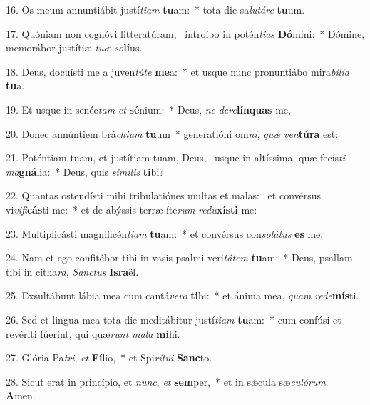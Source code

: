 16. Os meum annuntiábit justí\textit{ti}\textit{am} \textbf{tu}am:~*  tota die sa\textit{lu}\textit{tá}\textit{re} \textbf{tu}um.\

17. Quóniam non cognóvi litteratúram, \dag\  introíbo in potén\textit{ti}\textit{as} \textbf{Dó}mini:~*  Dómine, memorábor justítiæ \textit{tu}\textit{æ} \textit{so}\textbf{lí}us.\

18. Deus, docuísti me a juven\textit{tú}\textit{te} \textbf{me}a:~*  et usque nunc pronuntiábo mira\textit{bí}\textit{li}\textit{a} \textbf{tu}a.\

19. Et usque in senéc\textit{tam} \textit{et} \textbf{sé}nium:~*  Deus, \textit{ne} \textit{de}\textit{re}\textbf{lín}\textbf{quas} me,\

20. Donec annúntiem brá\textit{chi}\textit{um} \textbf{tu}um~*  generatióni om\textit{ni}, \textit{quæ} \textit{ven}\textbf{tú}\textbf{ra} est:\

21. Poténtiam tuam, et justítiam tuam, Deus, \dag\  usque in altíssima, quæ fecís\textit{ti} \textit{ma}\textbf{gná}lia:~*  Deus, quis \textit{sí}\textit{mi}\textit{lis} \textbf{ti}bi?\

22. Quantas ostendísti mihi tribulatiónes multas et malas: \dag\  et convérsus vi\textit{vi}\textit{fi}\textbf{cás}ti me:~*  et de abýssis terræ íte\textit{rum} \textit{re}\textit{du}\textbf{xís}\textbf{ti} me:\

23. Multiplicásti magnificén\textit{ti}\textit{am} \textbf{tu}am:~*  et convérsus con\textit{so}\textit{lá}\textit{tus} \textbf{es} me.\

24. Nam et ego confitébor tibi in vasis psalmi veri\textit{tá}\textit{tem} \textbf{tu}am:~*  Deus, psallam tibi in cítha\textit{ra}, \textit{Sanc}\textit{tus} \textbf{Is}\textbf{ra}ël.\

25. Exsultábunt lábia mea cum cantá\textit{ve}\textit{ro} \textbf{ti}bi:~*  et ánima mea, \textit{quam} \textit{red}\textit{e}\textbf{mís}ti.\

26. Sed et lingua mea tota die meditábitur justí\textit{ti}\textit{am} \textbf{tu}am:~*  cum confúsi et revériti fúerint, qui quæ\textit{runt} \textit{ma}\textit{la} \textbf{mi}hi.\

27. Glória Pa\textit{tri}, \textit{et} \textbf{Fí}lio,~*  et Spi\textit{rí}\textit{tu}\textit{i} \textbf{Sanc}to.\

28. Sicut erat in princípio, et \textit{nunc}, \textit{et} \textbf{sem}per,~*  et in sǽcula sæ\textit{cu}\textit{ló}\textit{rum}. \textbf{A}men.\

